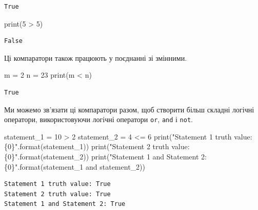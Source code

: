 \documentclass[
  letterpaper,
]{report}
\newenvironment{Shaded}{\begin{snugshade}}{\end{snugshade}}
\newcommand{\BuiltInTok}[1]{\textcolor[rgb]{0.00,0.23,0.31}{#1}}
\newcommand{\DecValTok}[1]{\textcolor[rgb]{0.68,0.00,0.00}{#1}}
\newcommand{\KeywordTok}[1]{\textcolor[rgb]{0.00,0.23,0.31}{#1}}
\newcommand{\NormalTok}[1]{\textcolor[rgb]{0.00,0.23,0.31}{#1}}
\newcommand{\OperatorTok}[1]{\textcolor[rgb]{0.37,0.37,0.37}{#1}}
\newcommand{\SpecialCharTok}[1]{\textcolor[rgb]{0.37,0.37,0.37}{#1}}
\newcommand{\StringTok}[1]{\textcolor[rgb]{0.13,0.47,0.30}{#1}}
\begin{document}
\begin{verbatim}
True
\end{verbatim}

\begin{Shaded}
\begin{Highlighting}[]
\BuiltInTok{print}\NormalTok{(}\DecValTok{5} \OperatorTok{\textgreater{}} \DecValTok{5}\NormalTok{)}
\end{Highlighting}
\end{Shaded}

\begin{verbatim}
False
\end{verbatim}

Ці компаратори також працюють у поєднанні зі змінними.

\begin{Shaded}
\begin{Highlighting}[]
\NormalTok{m }\OperatorTok{=} \DecValTok{2}
\NormalTok{n }\OperatorTok{=} \DecValTok{23}
\BuiltInTok{print}\NormalTok{(m }\OperatorTok{\textless{}}\NormalTok{ n)}
\end{Highlighting}
\end{Shaded}

\begin{verbatim}
True
\end{verbatim}

Ми можемо зв'язати ці компаратори разом, щоб створити більш складні
логічні оператори, використовуючи логічні оператори \texttt{or},
\texttt{and} і \texttt{not}.

\begin{Shaded}
\begin{Highlighting}[]
\NormalTok{statement\_1 }\OperatorTok{=} \DecValTok{10} \OperatorTok{\textgreater{}} \DecValTok{2}
\NormalTok{statement\_2 }\OperatorTok{=} \DecValTok{4} \OperatorTok{\textless{}=} \DecValTok{6}
\BuiltInTok{print}\NormalTok{(}\StringTok{"Statement 1 truth value: }\SpecialCharTok{\{0\}}\StringTok{"}\NormalTok{.}\BuiltInTok{format}\NormalTok{(statement\_1))}
\BuiltInTok{print}\NormalTok{(}\StringTok{"Statement 2 truth value: }\SpecialCharTok{\{0\}}\StringTok{"}\NormalTok{.}\BuiltInTok{format}\NormalTok{(statement\_2))}
\BuiltInTok{print}\NormalTok{(}\StringTok{"Statement 1 and Statement 2: }\SpecialCharTok{\{0\}}\StringTok{"}\NormalTok{.}\BuiltInTok{format}\NormalTok{(statement\_1 }\KeywordTok{and}\NormalTok{ statement\_2))}
\end{Highlighting}
\end{Shaded}

\begin{verbatim}
Statement 1 truth value: True
Statement 2 truth value: True
Statement 1 and Statement 2: True
\end{verbatim}
\end{document}
